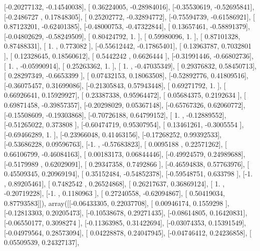 \documentclass{article}
\begin{document}
       [-0.20277132, -0.14540038],
       [ 0.36224005, -0.28984016],
       [-0.35530619, -0.52695841],
       [-0.2486727 ,  0.17848305],
       [ 0.25202772, -0.32894772],
       [-0.75594739, -0.61586921],
       [ 0.87123201, -0.62401385],
       [-0.48000753, -0.47322844],
       [ 0.13657461, -0.58891379],
       [-0.04802629, -0.58249509],
       [ 0.80424792,  1.        ],
       [ 0.59980096,  1.        ],
       [ 0.87101328,  0.87488331],
       [ 1.        ,  0.773082  ],
       [-0.55612442, -0.17865401],
       [ 0.13963787,  0.7032801 ],
       [ 0.12328645,  0.18560612],
       [ 0.5442242 ,  0.6626444 ],
       [-0.31991446, -0.66802736],
       [ 1.        , -0.05990914],
       [ 0.25263362,  1.        ],
       [ 1.        , -0.47035349],
       [ 0.29376832,  0.58450713],
       [ 0.28297349, -0.6653399 ],
       [ 0.07432153,  0.18063508],
       [-0.52892776,  0.41809516],
       [-0.36075457,  0.31699086],
       [-0.21305843,  0.57943448],
       [ 0.69271792,  1.        ],
       [ 0.66926641,  0.15929927],
       [ 0.23387338,  0.95964472],
       [ 0.05684375,  0.2192634 ],
       [ 0.69871458, -0.39857357],
       [-0.20298029,  0.05367148],
       [-0.65767326,  0.62060772],
       [-0.15508609, -0.19303868],
       [-0.70726188,  0.64799152],
       [ 1.        , -0.12889552],
       [-0.51265022,  0.373808  ],
       [-0.60474719,  0.95307954],
       [ 0.13461261, -0.3005554 ],
       [-0.69466289,  1.        ],
       [-0.23966048,  0.41463156],
       [-0.17268252,  0.99392533],
       [-0.53686228,  0.09596763],
       [-1.        , -0.57683823],
       [ 0.0095188 ,  0.22571262],
       [ 0.66106799, -0.46084163],
       [ 0.00183173,  0.06844446],
       [-0.49924579,  0.24989688],
       [-0.5179989 ,  0.62029091],
       [ 0.29347358,  0.7492866 ],
       [-0.46594838,  0.57763976],
       [ 0.45509345,  0.20969194],
       [ 0.35152484, -0.54852378],
       [-0.59548751,  0.633798  ],
       [-1.        ,  0.89205461],
       [ 0.7482542 ,  0.26524868],
       [ 0.26217637,  0.36869124],
       [ 1.        , -0.20719228],
       [-1.        ,  0.1180963 ],
       [ 0.27240558, -0.62094867],
       [ 0.50419034,  0.87793583]]), array([[-0.06433305,  0.22037708],
       [ 0.00946174,  0.1559298 ],
       [-0.12813303,  0.20205473],
       [-0.10538678,  0.29271435],
       [-0.08614805,  0.16420831],
       [-0.06550177,  0.3098274 ],
       [-0.11363985,  0.31422694],
       [-0.03074353,  0.15391549],
       [-0.04979564,  0.28573094],
       [ 0.04228878,  0.24047945],
       [-0.04746412,  0.24236858],
       [ 0.05509539,  0.24327137],
\end{document}
